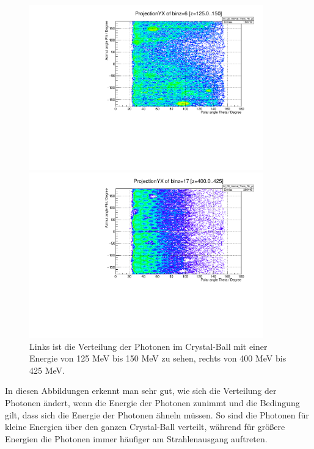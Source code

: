 \documentclass[a4paper,11pt,oneside,final,german,openbib,pdftex]{scrbook}
\begin{document}
{\begin{figure}[h!]
	\centering
	\begin{minipage}{0.45\textwidth}
		\centering
		\includegraphics[width=0.9\textwidth]{20170504ThetaPhiEnergySymmetric2014_10_125}
	\end{minipage}
	\hfill
	\begin{minipage}{0.45\textwidth}
		\centering
		\includegraphics[width=0.9\textwidth]{20170504ThetaPhiEnergySymmetric2014_10_400}
	\end{minipage}
	
	\caption{Links ist die Verteilung der Photonen im Crystal-Ball mit einer Energie von 125 MeV bis 150 MeV zu sehen, rechts von 400 MeV bis 425 MeV. }
\end{figure}

In diesen Abbildungen erkennt man sehr gut, wie sich die Verteilung der Photonen \"andert, wenn die Energie der Photonen zunimmt und die Bedingung gilt, dass sich die Energie der Photonen \"ahneln m\"ussen. So sind die Photonen f\"ur kleine Energien \"uber den ganzen Crystal-Ball verteilt, w\"ahrend f\"ur gr\"o{\ss}ere Energien die Photonen immer h\"aufiger am Strahlenausgang auftreten.

}
\end{document}
